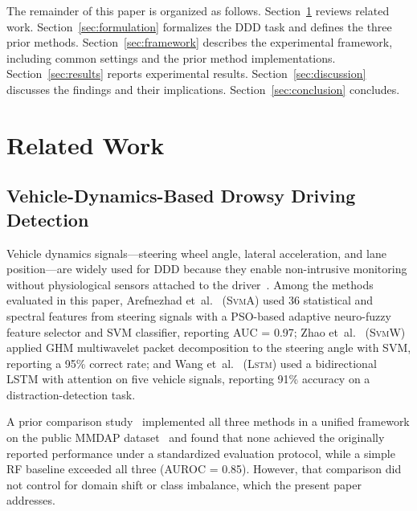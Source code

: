 \documentclass[lettersize,journal]{IEEEtran}
\newcommand{\Impl}[1]{\textsc{#1}}
\begin{document}
The remainder of this paper is organized as follows.
Section~\ref{sec:related} reviews related work.
Section~\ref{sec:formulation} formalizes the DDD task and defines the three prior methods.
Section~\ref{sec:framework} describes the experimental framework, including common settings and the prior method implementations.
Section~\ref{sec:results} reports experimental results.
Section~\ref{sec:discussion} discusses the findings and their implications.
Section~\ref{sec:conclusion} concludes.

\section{Related Work}
\label{sec:related}

\subsection{Vehicle-Dynamics-Based Drowsy Driving Detection}
Vehicle dynamics signals---steering wheel angle, lateral acceleration, and lane position---are widely used for DDD because they enable non-intrusive monitoring without physiological sensors attached to the driver~\cite{fu2024,fonseca2025,alquraishi2024,perkins2022}.
Among the methods evaluated in this paper,
Arefnezhad et~al.~\cite{arefnezhad2019} (\Impl{SvmA}) used 36 statistical and spectral features from steering signals with a PSO-based adaptive neuro-fuzzy feature selector and SVM classifier, reporting AUC = 0.97;
Zhao et~al.~\cite{zhao2012} (\Impl{SvmW}) applied GHM multiwavelet packet decomposition to the steering angle with SVM, reporting a 95\% correct rate;
and Wang et~al.~\cite{wang2022} (\Impl{Lstm}) used a bidirectional LSTM with attention on five vehicle signals, reporting 91\% accuracy on a distraction-detection task.

A prior comparison study~\cite{nakagama2025iv} implemented all three methods in a unified framework on the public MMDAP dataset~\cite{aygun2024} and found that none achieved the originally reported performance under a standardized evaluation protocol, while a simple RF baseline exceeded all three (AUROC = 0.85).
However, that comparison did not control for domain shift or class imbalance, which the present paper addresses.
\end{document}
